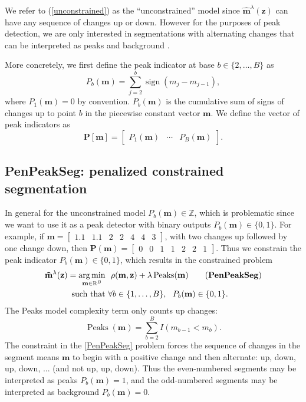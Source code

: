 \documentclass{article}
\DeclareMathOperator*{\argmin}{arg\,min}
\DeclareMathOperator*{\sign}{sign}
\DeclareMathOperator*{\Peaks}{Peaks}
\newcommand{\ZZ}{\mathbb Z}
\newcommand{\RR}{\mathbb R}
\begin{document}
We refer to (\ref{unconstrained}) as the ``unconstrained'' model since
$\mathbf{\hat m}^\lambda(\mathbf z)$ can have any sequence of changes
up or down. However for the purposes of peak detection, we are only
interested in segmentations with alternating changes that can be
interpreted as peaks and background \citep{PeakSeg}.

More concretely, we first define the peak indicator at base
$b\in\{2, \dots, B\}$ as
\begin{equation}
  \label{eq:peaks}
  P_b(\mathbf m) = \sum_{j=2}^b \sign( m_{j} - m_{j-1} ),
\end{equation}
where $P_1(\mathbf m)=0$ by convention. $P_b(\mathbf m)$ is the
cumulative sum of signs of changes up to point $b$ in the piecewise
constant vector $\mathbf m$. We define the vector of peak indicators
as
\begin{equation}
  \mathbf
  P[\mathbf m] = \left[
    \begin{array}{ccc}
      P_1(\mathbf m) & \cdots & P_B(\mathbf m)
    \end{array}\right].
\end{equation}

\subsection{PenPeakSeg: penalized constrained segmentation}
\label{sec:constrained}

In general for the unconstrained model $P_b(\mathbf m)\in\ZZ$, which
is problematic since we want to use it as a peak detector with binary
outputs $P_b(\mathbf m)\in \{0, 1\}$. 
For example, if $\mathbf m = \left[\begin{array}{ccccccc}1.1 &
    1.1 & 2 & 2 & 4 & 4 & 3\end{array}\right]$, with two changes up
followed by one change down, then $\mathbf P(\mathbf m) =
\left[\begin{array}{ccccccc}0 & 0 & 1 & 1 & 2 & 2 &
    1 \end{array}\right]$.
Thus we constrain the peak indicator $P_b(\mathbf m)\in\{0, 1\}$,
which results in the constrained problem
\begin{align*}
  \label{PenPeakSeg}
  \mathbf{\tilde m}^\lambda(\mathbf z)  =
  \argmin_{\mathbf m\in\RR^{B}} &\ \ 
    \rho(\mathbf m, \mathbf z) + \lambda\Peaks(\mathbf m)
    \tag{\textbf{PenPeakSeg}}
  \\
  \text{such that} &\ \forall b\in\{1, \dots, B\},
                     \ \ P_b(\mathbf m) \in\{0, 1\}.
\end{align*}
The Peaks model complexity term only counts up changes:
\begin{equation}
  \Peaks(\mathbf m) = \sum_{b=2}^B I(m_{b-1} < m_b).
\end{equation}
The constraint in the \ref{PenPeakSeg} problem forces the sequence of
changes in the segment means $\mathbf m$ to begin with a positive
change and then alternate: up, down, up, down, ... (and not up, up,
down). Thus the even-numbered segments may be interpreted as peaks
$P_b(\mathbf m)=1$, and the odd-numbered segments may be interpreted
as background $P_b(\mathbf m)=0$.
\end{document}
